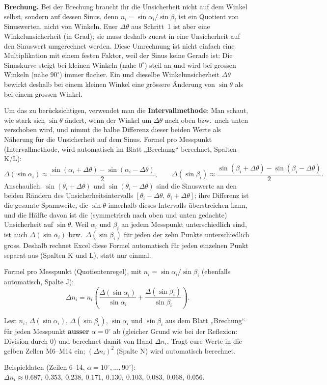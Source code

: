 \documentclass[11pt,a4paper]{article}
\begin{document}
\textbf{Brechung.} Bei der Brechung braucht ihr die Unsicherheit nicht auf dem Winkel selbst, sondern auf dessen Sinus, denn $n_i=\sin\alpha_i/\sin\beta_i$ ist ein Quotient von Sinuswerten, nicht von Winkeln. Euer $\Delta\theta$ aus Schritt~1 ist aber eine Winkelunsicherheit (in Grad); sie muss deshalb zuerst in eine Unsicherheit auf den Sinuswert umgerechnet werden. Diese Umrechnung ist nicht einfach eine Multiplikation mit einem festen Faktor, weil der Sinus keine Gerade ist: Die Sinuskurve steigt bei kleinen Winkeln (nahe $0^\circ$) steil an und wird bei grossen Winkeln (nahe $90^\circ$) immer flacher. Ein und dieselbe Winkelunsicherheit $\Delta\theta$ bewirkt deshalb bei einem kleinen Winkel eine grössere Änderung von $\sin\theta$ als bei einem grossen Winkel.

Um das zu berücksichtigen, verwendet man die \textbf{Intervallmethode}: Man schaut, wie stark sich $\sin\theta$ ändert, wenn der Winkel um $\Delta\theta$ nach oben bzw.\ nach unten verschoben wird, und nimmt die halbe Differenz dieser beiden Werte als Näherung für die Unsicherheit auf dem Sinus. Formel pro Messpunkt (Intervallmethode, wird automatisch im Blatt „Brechung“ berechnet, Spalten K/L):
\[
  \Delta(\sin\alpha_i) \approx \frac{\sin(\alpha_i+\Delta\theta)-\sin(\alpha_i-\Delta\theta)}{2}, \qquad \Delta(\sin\beta_i) \approx \frac{\sin(\beta_i+\Delta\theta)-\sin(\beta_i-\Delta\theta)}{2}.
\]
Anschaulich: $\sin(\theta_i+\Delta\theta)$ und $\sin(\theta_i-\Delta\theta)$ sind die Sinuswerte an den beiden Rändern des Unsicherheitsintervalls $[\theta_i-\Delta\theta,\ \theta_i+\Delta\theta]$; ihre Differenz ist die gesamte Spannweite, die $\sin\theta$ innerhalb dieses Intervalls überstreichen kann, und die Hälfte davon ist die (symmetrisch nach oben und unten gedachte) Unsicherheit auf $\sin\theta$. Weil $\alpha_i$ und $\beta_i$ an jedem Messpunkt unterschiedlich sind, ist auch $\Delta(\sin\alpha_i)$ bzw.\ $\Delta(\sin\beta_i)$ für jeden der zehn Punkte unterschiedlich gross. Deshalb rechnet Excel diese Formel automatisch für jeden einzelnen Punkt separat aus (Spalten K und L), statt nur einmal.

Formel pro Messpunkt (Quotientenregel), mit $n_i=\sin\alpha_i/\sin\beta_i$ (ebenfalls automatisch, Spalte J):
\[
  \Delta n_i = n_i\left(\frac{\Delta(\sin\alpha_i)}{\sin\alpha_i}+\frac{\Delta(\sin\beta_i)}{\sin\beta_i}\right).
\]

\begin{aufgabebox}
Lest $n_i$, $\Delta(\sin\alpha_i)$, $\Delta(\sin\beta_i)$, $\sin\alpha_i$ und $\sin\beta_i$ aus dem Blatt „Brechung“ für jeden Messpunkt \textbf{ausser} $\alpha=0^\circ$ ab (gleicher Grund wie bei der Reflexion: Division durch $0$) und berechnet damit von Hand $\Delta n_i$. Tragt eure Werte in die gelben Zellen M6--M14 ein; $(\Delta n_i)^2$ (Spalte N) wird automatisch berechnet.
\end{aufgabebox}
\begin{solution}
\begin{loesungbox}
Beispieldaten (Zeilen 6--14, $\alpha=10^\circ,\dots,90^\circ$): $\Delta n_i \approx 0.687,\ 0.353,\ 0.238,\ 0.171,\ 0.130,\ 0.103,\ 0.083,\ 0.068,\ 0.056$.
\end{loesungbox}
\end{solution}
\end{document}
